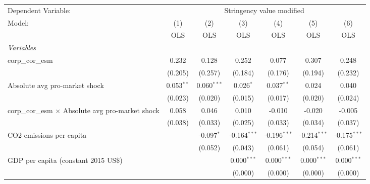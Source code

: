 
\begingroup
\centering
\begin{tabular}{lcccccc}
   \toprule
   Dependent Variable: & \multicolumn{6}{c}{Stringency value modified}\\
   Model:                                                   & (1)          & (2)           & (3)            & (4)            & (5)            & (6)\\  
                                                            &  OLS         & OLS           & OLS            & OLS            & OLS            & OLS\\  
   \midrule
   \emph{Variables}\\
   corp\_cor\_esm                                           & 0.232        & 0.128         & 0.252          & 0.077          & 0.307          & 0.248\\   
                                                            & (0.205)      & (0.257)       & (0.184)        & (0.176)        & (0.194)        & (0.232)\\   
   Absolute avg pro-market shock                            & 0.053$^{**}$ & 0.060$^{***}$ & 0.026$^{*}$    & 0.037$^{**}$   & 0.024          & 0.040\\   
                                                            & (0.023)      & (0.020)       & (0.015)        & (0.017)        & (0.020)        & (0.024)\\   
   corp\_cor\_esm $\times$ Absolute avg pro-market shock    & 0.058        & 0.046         & 0.010          & -0.010         & -0.020         & -0.005\\   
                                                            & (0.038)      & (0.033)       & (0.025)        & (0.033)        & (0.034)        & (0.037)\\   
   CO2 emissions per capita                                 &              & -0.097$^{*}$  & -0.164$^{***}$ & -0.196$^{***}$ & -0.214$^{***}$ & -0.175$^{***}$\\   
                                                            &              & (0.052)       & (0.043)        & (0.061)        & (0.054)        & (0.061)\\   
   GDP per capita (constant 2015 US\$)                      &              &               & 0.000$^{***}$  & 0.000$^{***}$  & 0.000$^{***}$  & 0.000$^{***}$\\   
                                                            &              &               & (0.000)        & (0.000)        & (0.000)        & (0.000)\\   

\end{tabular}
